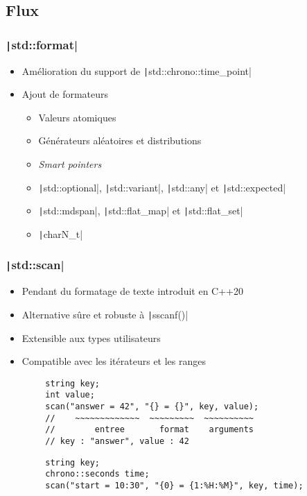 \documentclass[C++.tex]{subfiles}
\begin{document}
\subsection*{Flux}
\begin{frame}[fragile]
	\frametitle{\texttt|std::format|}
	\begin{itemize}
		\item Amélioration du support de \texttt|std::chrono::time_point|
		\item Ajout de formateurs
		\begin{itemize}
			\item Valeurs atomiques
			\item Générateurs aléatoires et distributions
			\item \textit{Smart pointers}
			\item \texttt|std::optional|, \texttt|std::variant|, \texttt|std::any| et \texttt|std::expected|
			\item \texttt|std::mdspan|, \texttt|std::flat_map| et \texttt|std::flat_set|
			\item \texttt|charN_t|
		\end{itemize}
	\end{itemize}

\end{frame}

\begin{frame}[fragile]
	\frametitle{\texttt|std::scan|}
	\begin{itemize}
		\item Pendant du formatage de texte introduit en C++20
		\item Alternative sûre et robuste à \texttt|sscanf()|
		\item Extensible aux types utilisateurs
		\item Compatible avec les itérateurs et les ranges
	\end{itemize}

	\begin{verbatim}
		string key;
		int value;
		scan("answer = 42", "{} = {}", key, value);
		//    ~~~~~~~~~~~~~  ~~~~~~~~~  ~~~~~~~~~~
		//        entree       format    arguments
		// key : "answer", value : 42
	\end{verbatim}

	\begin{verbatim}
		string key;
		chrono::seconds time;
		scan("start = 10:30", "{0} = {1:%H:%M}", key, time);
	\end{verbatim}
\end{frame}
\end{document}
